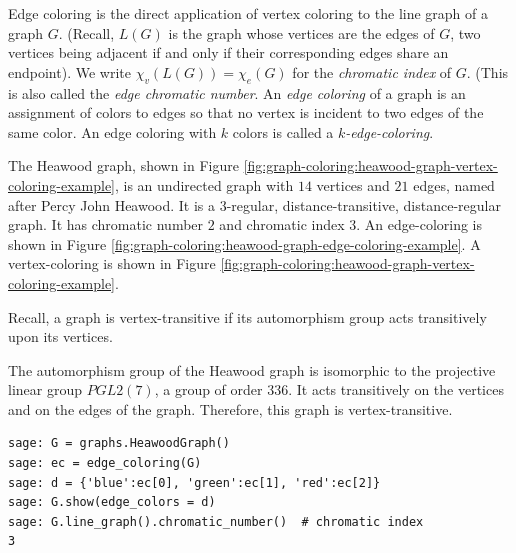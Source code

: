Edge coloring is the direct application of vertex coloring to the
line graph of a graph $G$. (Recall, $L(G)$ is the graph whose
vertices are the edges of $G$, two vertices being adjacent if and
only if their corresponding edges share an endpoint).
We write $\chi_v(L(G)) = \chi_e(G)$ for the {\it chromatic index} of $G$.
(This is also called the {\it edge chromatic number}.
An {\it edge coloring} of a graph is an assignment of colors to
edges so that no vertex is
incident to two edges of the same color. An edge coloring with
$k$ colors is called a {\it $k$-edge-coloring}.

\begin{example}
\label{example:graph-coloring:heawood-graph-example}
The Heawood graph, shown in Figure
\ref{fig:graph-coloring:heawood-graph-vertex-coloring-example},
is an undirected graph with $14$ vertices and $21$ edges, named after
Percy John Heawood.
It is a $3$-regular, distance-transitive, distance-regular graph.
It has chromatic number $2$ and chromatic index $3$.
An edge-coloring is shown in Figure
\ref{fig:graph-coloring:heawood-graph-edge-coloring-example}.
A vertex-coloring is shown in Figure
\ref{fig:graph-coloring:heawood-graph-vertex-coloring-example}.

Recall, a graph is vertex-transitive if its automorphism
group acts transitively upon its vertices.

The automorphism group of the Heawood graph is isomorphic to the
projective linear group $PGL2(7)$, a group of order $336$. It acts
transitively on the vertices and on the edges of the
graph. Therefore, this graph is vertex-transitive.
\end{example}

\begin{lstlisting}
sage: G = graphs.HeawoodGraph()
sage: ec = edge_coloring(G)
sage: d = {'blue':ec[0], 'green':ec[1], 'red':ec[2]}
sage: G.show(edge_colors = d)
sage: G.line_graph().chromatic_number()  # chromatic index
3
\end{lstlisting}

